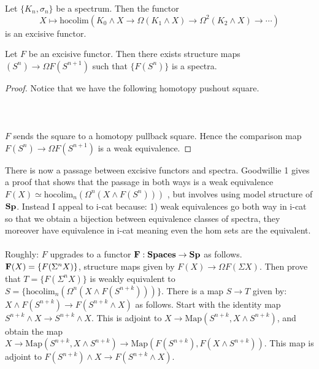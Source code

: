 \documentclass[a4paper]{article}
\begin{document}
\begin{thm}{}{} Let $\{K_n,\sigma_n\}$ be a spectrum. Then the functor $$X\mapsto\text{hocolim}(K_0\wedge X\rightarrow\Omega(K_1\wedge X)\rightarrow\Omega^2(K_2\wedge X)\rightarrow\cdots)$$ is an excisive functor. 
\end{thm}

\begin{prp}{}{} Let $F$ be an excisive functor. Then there exists structure maps $(S^n)\to \Omega F(S^{n+1})$ such that $\{F(S^n)\}$ is a spectra. \tcbline
\begin{proof}
Notice that we have the following homotopy pushout square. \\~\\
\\~\\
$F$ sends the square to a homotopy pullback square. Hence the comparison map $F(S^n)\to\Omega F(S^{n+1})$ is a weak equivalence. 
\end{proof}
\end{prp}

There is now a passage between excisive functors and spectra. Goodwillie 1 gives a proof that shows that the passage in both ways is a weak equivalence $F(X)\simeq\text{hocolim}_n(\Omega^n(X\wedge F(S^n)))$ , but involves using model structure of $\bold{Sp}$. Instead I appeal to i-cat because: 1) weak equivalences go both way in i-cat so that we obtain a bijection between equivalence classes of spectra, they moreover have equivalence in i-cat meaning even the hom sets are the equivalent. \\~\\

Roughly: $F$ upgrades to a functor $\bold{F}:\bold{Spaces}\to\bold{Sp}$ as follows. $\bold{F}(X)=\{F(\Sigma^nX)\}$, structure maps given by $F(X)\to\Omega F(\Sigma X)$. Then prove that $T=\{F(\Sigma^nX)\}$ is weakly equivalent to $S=\{\text{hocolim}_n(\Omega^n(X\wedge F(S^{n+k})))\}$. There is a map $S\to T$ given by: $X\wedge F(S^{n+k})\to F(S^{n+k}\wedge X)$ as follows. Start with the identity map $S^{n+k}\wedge X\to S^{n+k}\wedge X$. This is adjoint to $X\to\text{Map}(S^{n+k},X\wedge S^{n+k})$, and obtain the map $X\to\text{Map}(S^{n+k},X\wedge S^{n+k})\to\text{Map}(F(S^{n+k}),F(X\wedge S^{n+k}))$. This map is adjoint to $F(S^{n+k})\wedge X\to F(S^{n+k}\wedge X)$. 
\end{document}
